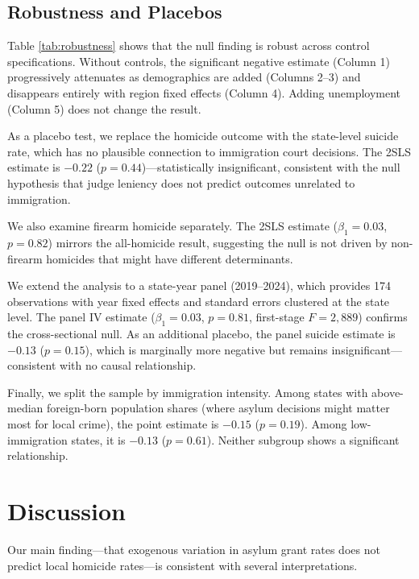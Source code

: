 \documentclass[12pt]{article}
\begin{document}
\subsection{Robustness and Placebos}



Table \ref{tab:robustness} shows that the null finding is robust across control specifications. Without controls, the significant negative estimate (Column 1) progressively attenuates as demographics are added (Columns 2--3) and disappears entirely with region fixed effects (Column 4). Adding unemployment (Column 5) does not change the result.

As a placebo test, we replace the homicide outcome with the state-level suicide rate, which has no plausible connection to immigration court decisions. The 2SLS estimate is $-0.22$ ($p = 0.44$)---statistically insignificant, consistent with the null hypothesis that judge leniency does not predict outcomes unrelated to immigration.

We also examine firearm homicide separately. The 2SLS estimate ($\beta_1 = 0.03$, $p = 0.82$) mirrors the all-homicide result, suggesting the null is not driven by non-firearm homicides that might have different determinants.

We extend the analysis to a state-year panel (2019--2024), which provides 174 observations with year fixed effects and standard errors clustered at the state level. The panel IV estimate ($\beta_1 = 0.03$, $p = 0.81$, first-stage $F = 2{,}889$) confirms the cross-sectional null. As an additional placebo, the panel suicide estimate is $-0.13$ ($p = 0.15$), which is marginally more negative but remains insignificant---consistent with no causal relationship.

Finally, we split the sample by immigration intensity. Among states with above-median foreign-born population shares (where asylum decisions might matter most for local crime), the point estimate is $-0.15$ ($p = 0.19$). Among low-immigration states, it is $-0.13$ ($p = 0.61$). Neither subgroup shows a significant relationship.


\section{Discussion}

Our main finding---that exogenous variation in asylum grant rates does not predict local homicide rates---is consistent with several interpretations.
\end{document}
